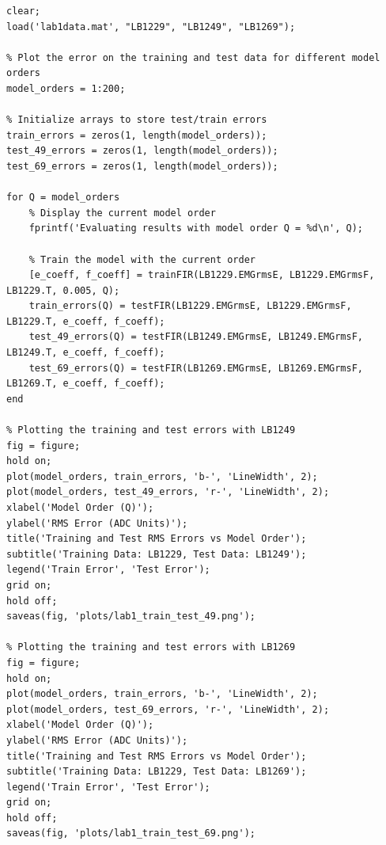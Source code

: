 \documentclass[12pt]{article}
\begin{document}
\newpage
\begin{lstlisting}[caption={generate\_train\_test.m}]
% Generates training/test error plots for Q = 1:200, Tol = 0.005
clear;
load('lab1data.mat', "LB1229", "LB1249", "LB1269");

% Plot the error on the training and test data for different model orders
model_orders = 1:200;

% Initialize arrays to store test/train errors
train_errors = zeros(1, length(model_orders));
test_49_errors = zeros(1, length(model_orders));
test_69_errors = zeros(1, length(model_orders));

for Q = model_orders
    % Display the current model order
    fprintf('Evaluating results with model order Q = %d\n', Q);

    % Train the model with the current order
    [e_coeff, f_coeff] = trainFIR(LB1229.EMGrmsE, LB1229.EMGrmsF, LB1229.T, 0.005, Q);
    train_errors(Q) = testFIR(LB1229.EMGrmsE, LB1229.EMGrmsF, LB1229.T, e_coeff, f_coeff);
    test_49_errors(Q) = testFIR(LB1249.EMGrmsE, LB1249.EMGrmsF, LB1249.T, e_coeff, f_coeff);
    test_69_errors(Q) = testFIR(LB1269.EMGrmsE, LB1269.EMGrmsF, LB1269.T, e_coeff, f_coeff);
end

% Plotting the training and test errors with LB1249
fig = figure;
hold on;
plot(model_orders, train_errors, 'b-', 'LineWidth', 2);
plot(model_orders, test_49_errors, 'r-', 'LineWidth', 2);
xlabel('Model Order (Q)');
ylabel('RMS Error (ADC Units)');
title('Training and Test RMS Errors vs Model Order');
subtitle('Training Data: LB1229, Test Data: LB1249');
legend('Train Error', 'Test Error');
grid on;
hold off;
saveas(fig, 'plots/lab1_train_test_49.png');

% Plotting the training and test errors with LB1269
fig = figure;
hold on;
plot(model_orders, train_errors, 'b-', 'LineWidth', 2);
plot(model_orders, test_69_errors, 'r-', 'LineWidth', 2);
xlabel('Model Order (Q)');
ylabel('RMS Error (ADC Units)');
title('Training and Test RMS Errors vs Model Order');
subtitle('Training Data: LB1229, Test Data: LB1269');
legend('Train Error', 'Test Error');
grid on;
hold off;
saveas(fig, 'plots/lab1_train_test_69.png');
\end{lstlisting}
\end{document}
